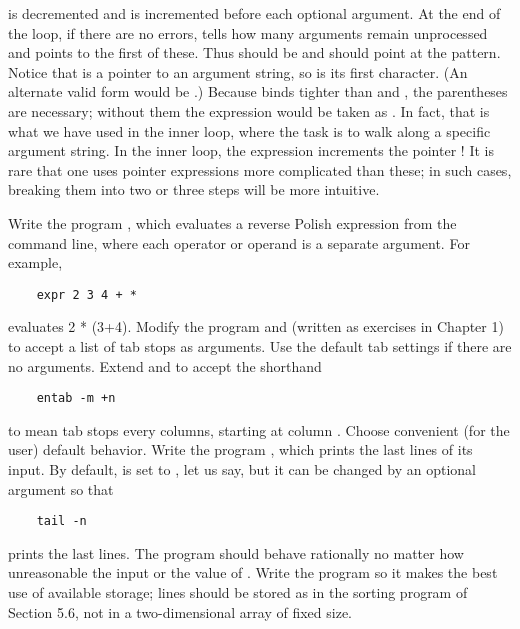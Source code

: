  is decremented and  is incremented before each optional argument.
At the end of the loop, if there are no errors,  tells how many arguments remain unprocessed and  points to the first of these.
Thus  should be  and  should point at the pattern.
Notice that  is a pointer to an argument string, so  is its first character. (An alternate valid form would be .)
Because \code{[]} binds tighter than \code{*} and \code{++}, the parentheses are necessary; without them the expression would be taken as .
In fact, that is what we have used in the inner loop, where the task is to walk along a specific argument string.
In the inner loop, the expression  increments the pointer !
It is rare that one uses pointer expressions more complicated than these; in such cases, breaking them into two or three steps will be more intuitive.
\newline

\begin{ExerciseList}
\Exercise Write the program , which evaluates a reverse Polish expression from the command line, where each operator or operand is a separate argument. For example,
\begin{lstlisting}
    expr 2 3 4 + *
\end{lstlisting}
evaluates 2 * (3+4).
\Exercise Modify the program  and  (written as exercises in Chapter 1) to accept a list of tab stops as arguments. Use the default tab settings if there are no arguments.
\Exercise Extend  and  to accept the shorthand
\begin{lstlisting}
    entab -m +n
\end{lstlisting}
to mean tab stops every  columns, starting at column . Choose convenient (for the user) default behavior.
\Exercise Write the program , which prints the last  lines of its input.
By default,  is set to , let us say, but it can be changed by an optional argument so that
\begin{lstlisting}
    tail -n
\end{lstlisting}
prints the last  lines.
The program should behave rationally no matter how unreasonable the input or the value of .
Write the program so it makes the best use of available storage; lines should be stored as in the sorting program of Section 5.6, not in a two-dimensional array of fixed size.
\end{ExerciseList}



